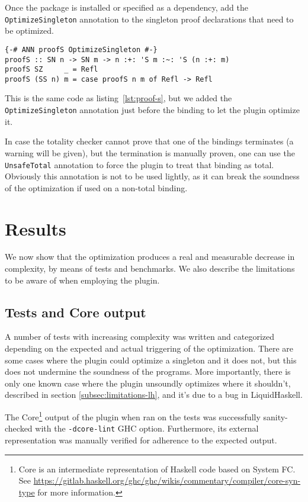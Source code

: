 Once the package is installed or specified as a dependency, add the \texttt{OptimizeSingleton} annotation to the singleton proof declarations that need to be optimized.

\begin{lstlisting}[caption=Optimizing \texttt{proofS}]
{-# ANN proofS OptimizeSingleton #-}
proofS :: SN n -> SN m -> n :+: 'S m :~: 'S (n :+: m)
proofS SZ     _ = Refl
proofS (SS n) m = case proofS n m of Refl -> Refl
\end{lstlisting}

This is the same code as listing~\ref{lst:proof-s}, but we added the \texttt{OptimizeSingleton} annotation just before the binding to let the plugin optimize it.

In case the totality checker cannot prove that one of the bindings terminates (a warning will be given), but the termination is manually proven, one can use the \texttt{UnsafeTotal} annotation to force the plugin to treat that binding as total.
Obviously this annotation is not to be used lightly, as it can break the soundness of the optimization if used on a non-total binding.

\chapter{Results}
\label{cha:results}

We now show that the optimization produces a real and measurable decrease in complexity, by means of tests and benchmarks.
We also describe the limitations to be aware of when employing the plugin.

\section{Tests and Core output}
\label{sec:tests}

A number of tests with increasing complexity was written and categorized depending on the expected and actual triggering of the optimization.
There are some cases where the plugin could optimize a singleton and it does not, but this does not undermine the soundness of the programs.
More importantly, there is only one known case where the plugin unsoundly optimizes where it shouldn't, described in section \ref{subsec:limitations-lh}, and it's due to a bug in LiquidHaskell.

The Core\footnote{Core is an intermediate representation of Haskell code based on System FC. See \url{https://gitlab.haskell.org/ghc/ghc/wikis/commentary/compiler/core-syn-type} for more information.} output of the plugin when ran on the tests was successfully sanity-checked with the \texttt{-dcore-lint} GHC option.
Furthermore, its external representation\cite{core-external-representation} was manually verified for adherence to the expected output.

